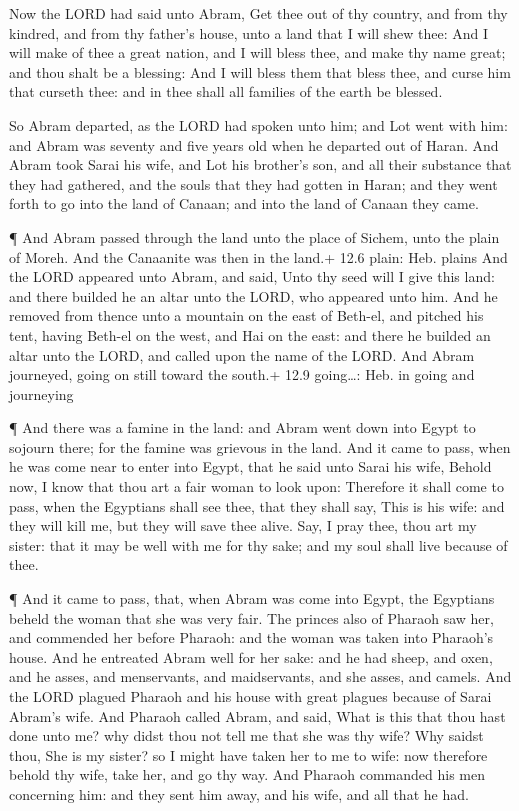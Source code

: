  Now the LORD had said unto Abram, Get thee out of thy
country, and from thy kindred, and from thy father's house, unto a land
that I will shew thee:  And I will make of thee a great
nation, and I will bless thee, and make thy name great; and thou shalt
be a blessing:  And I will bless them that bless thee, and
curse him that curseth thee: and in thee shall all families of the earth
be blessed.

 So Abram departed, as the LORD had spoken unto him; and Lot
went with him: and Abram was seventy and five years old when he departed
out of Haran.  And Abram took Sarai his wife, and Lot his
brother's son, and all their substance that they had gathered, and the
souls that they had gotten in Haran; and they went forth to go into the
land of Canaan; and into the land of Canaan they came.

 ¶ And Abram passed through the land unto the place of
Sichem, unto the plain of Moreh. And the Canaanite was then in the
land.+ 12.6 plain: Heb. plains  And the LORD appeared unto
Abram, and said, Unto thy seed will I give this land: and there builded
he an altar unto the LORD, who appeared unto him.  And he
removed from thence unto a mountain on the east of Beth-el, and pitched
his tent, having Beth-el on the west, and Hai on the east: and there he
builded an altar unto the LORD, and called upon the name of the LORD.
 And Abram journeyed, going on still toward the south.+ 12.9
going\ldots: Heb. in going and journeying

 ¶ And there was a famine in the land: and Abram went down
into Egypt to sojourn there; for the famine was grievous in the land.
 And it came to pass, when he was come near to enter into
Egypt, that he said unto Sarai his wife, Behold now, I know that thou
art a fair woman to look upon:  Therefore it shall come to
pass, when the Egyptians shall see thee, that they shall say, This is
his wife: and they will kill me, but they will save thee alive.
 Say, I pray thee, thou art my sister: that it may be well
with me for thy sake; and my soul shall live because of thee.

 ¶ And it came to pass, that, when Abram was come into
Egypt, the Egyptians beheld the woman that she was very fair.
 The princes also of Pharaoh saw her, and commended her
before Pharaoh: and the woman was taken into Pharaoh's house.
 And he entreated Abram well for her sake: and he had
sheep, and oxen, and he asses, and menservants, and maidservants, and
she asses, and camels.  And the LORD plagued Pharaoh and
his house with great plagues because of Sarai Abram's wife.
 And Pharaoh called Abram, and said, What is this that thou
hast done unto me? why didst thou not tell me that she was thy wife?
 Why saidst thou, She is my sister? so I might have taken
her to me to wife: now therefore behold thy wife, take her, and go thy
way.  And Pharaoh commanded his men concerning him: and
they sent him away, and his wife, and all that he had.

